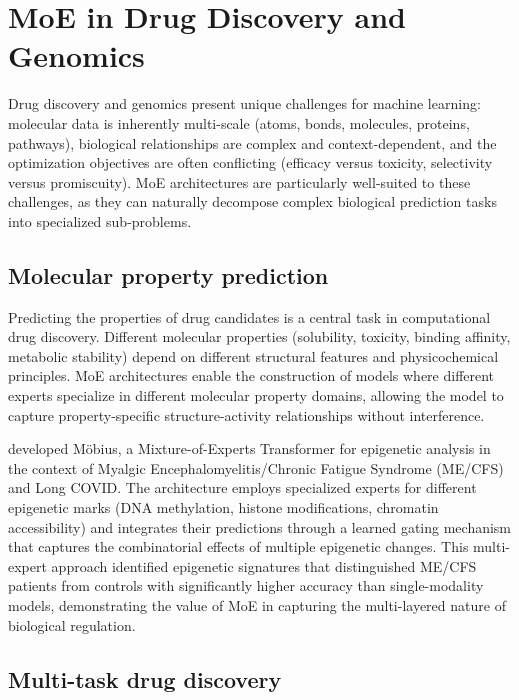
\section*{MoE in Drug Discovery and Genomics}

Drug discovery and genomics present unique challenges for machine learning: molecular data is inherently multi-scale (atoms, bonds, molecules, proteins, pathways), biological relationships are complex and context-dependent, and the optimization objectives are often conflicting (efficacy versus toxicity, selectivity versus promiscuity). MoE architectures are particularly well-suited to these challenges, as they can naturally decompose complex biological prediction tasks into specialized sub-problems.

\subsection*{Molecular property prediction}

Predicting the properties of drug candidates is a central task in computational drug discovery. Different molecular properties (solubility, toxicity, binding affinity, metabolic stability) depend on different structural features and physicochemical principles. MoE architectures enable the construction of models where different experts specialize in different molecular property domains, allowing the model to capture property-specific structure-activity relationships without interference.

\cite{acharya2025mobius} developed M\"{o}bius, a Mixture-of-Experts Transformer for epigenetic analysis in the context of Myalgic Encephalomyelitis/Chronic Fatigue Syndrome (ME/CFS) and Long COVID. The architecture employs specialized experts for different epigenetic marks (DNA methylation, histone modifications, chromatin accessibility) and integrates their predictions through a learned gating mechanism that captures the combinatorial effects of multiple epigenetic changes. This multi-expert approach identified epigenetic signatures that distinguished ME/CFS patients from controls with significantly higher accuracy than single-modality models, demonstrating the value of MoE in capturing the multi-layered nature of biological regulation.

\subsection*{Multi-task drug discovery}

